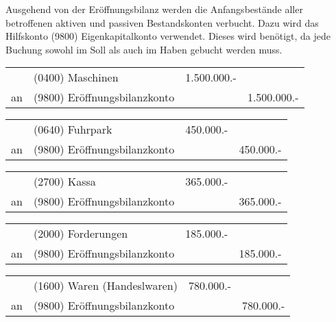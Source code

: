\documentclass[parskip=half,12pt,a4paper]{scrartcl}
\begin{document}
Ausgehend von der Eröffnungsbilanz werden die Anfangsbestände aller betroffenen aktiven und passiven Bestandskonten verbucht. Dazu wird das Hilfskonto (9800) Eigenkapitalkonto verwendet. Dieses wird benötigt, da jede Buchung sowohl im Soll als auch im Haben gebucht werden muss.

\begin{center}
\begin{tabularx}{\textwidth}{rXrr}
 \toprule
    & (0400) Maschinen & 1.500.000.- &\\
 an & (9800) Eröffnungsbilanzkonto & & 1.500.000.-\\
 \bottomrule
\end{tabularx}
\end{center}

\begin{center}
	\begin{tabularx}{\textwidth}{rXrr}
		\toprule
		& (0640) Fuhrpark & 450.000.- &\\
		an & (9800) Eröffnungsbilanzkonto & & 450.000.-\\
		\bottomrule
	\end{tabularx}
\end{center}

\begin{center}
	\begin{tabularx}{\textwidth}{rXrr}
		\toprule
		& (2700) Kassa & 365.000.- &\\
		an & (9800) Eröffnungsbilanzkonto & & 365.000.-\\
		\bottomrule
	\end{tabularx}
\end{center}

\begin{center}
	\begin{tabularx}{\textwidth}{rXrr}
		\toprule
		& (2000) Forderungen & 185.000.- &\\
		an & (9800) Eröffnungsbilanzkonto & & 185.000.-\\
		\bottomrule
	\end{tabularx}
\end{center}

\begin{center}
	\begin{tabularx}{\textwidth}{rXrr}
		\toprule
		& (1600) Waren (Handeslwaren) & 780.000.- &\\
		an & (9800) Eröffnungsbilanzkonto & & 780.000.-\\
		\bottomrule
	\end{tabularx}
\end{center}
\end{document}
